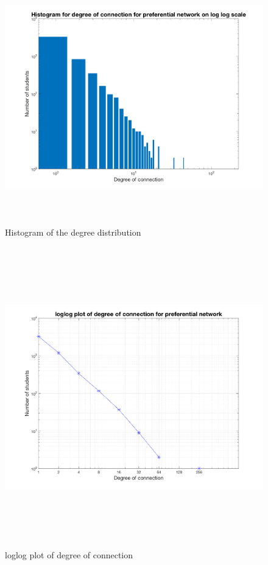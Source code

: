 \documentclass[12pt]{article}
\begin{document}
\begin{figure}[H] %
\centering
\includegraphics[width = 14 cm, height = 11cm]{p_nw2.png}
\caption{Histogram of the degree distribution }
\label{fig:degreehist}
\end{figure}

\begin{figure}[H] %
\centering
\includegraphics[width = 16 cm, height = 13cm]{p_nw.png}
\caption{loglog plot of degree of connection}
\label{fig:degreeloglog}
\end{figure}
\end{document}
